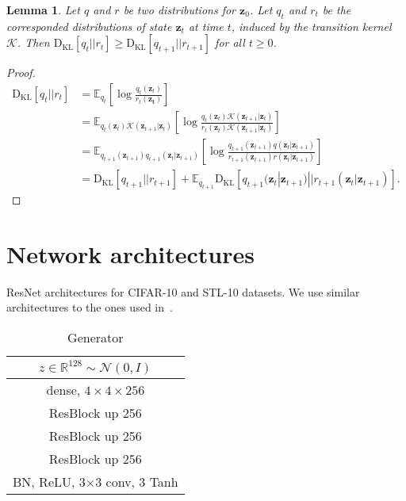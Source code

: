 \documentclass{article}
\newtheorem{lemma}{Lemma}
\begin{document}
\begin{lemma}\label{lem:dd}
\cite{cover2012elements}
Let $q$ and $r$ be two distributions for $\bm{z}_0$. Let $q_t$ and $r_t$ be the corresponded distributions of state $\bm{z}_t$ at time $t$, induced by the transition kernel $\mathcal{K}$. Then $\mathrm{D}_{\text{KL}}[q_t||r_t] \geq \mathrm{D}_{\text{KL}}[q_{t+1}||r_{t+1}]$ for all $t \geq 0$.
\end{lemma}
\begin{proof}
\begin{equation*}
\begin{aligned}
\mathrm{D}_{\text{KL}}[q_t||r_t] &= \mathbb{E}_{q_t}\left[ \log \frac{q_t(\bm{z}_t)}{r_t(\bm{z_t})} \right] \\
&= \mathbb{E}_{q_t(\bm{z}_t) \mathcal{K}(\bm{z}_{t+1}|\bm{z}_t) }\left[ \log \frac{q_t(\bm{z}_t) \mathcal{K}(\bm{z}_{t+1}|\bm{z}_t) }{r_t(\bm{z}_t) \mathcal{K}(\bm{z}_{t+1}|\bm{z}_t)} \right] \\
&= \mathbb{E}_{q_{t+1}(\bm{z}_{t+1}) q_{t+1}(\bm{z}_t|\bm{z}_{t+1})}\left[ \log \frac{q_{t+1}(\bm{z}_{t+1}) q(\bm{z}_{t}|\bm{z}_{t+1}) }{r_{t+1}(\bm{z}_{t+1}) r(\bm{z}_{t}|\bm{z}_{t+1})} \right] \\
&= \mathrm{D}_{\text{KL}}[q_{t+1}||r_{t+1}] + \mathbb{E}_{q_{t+1}} \mathrm{D}_{\text{KL}}[q_{t+1}(\bm{z}_t | \bm{z}_{t+1}) || r_{t+1}(\bm{z}_t | \bm{z}_{t+1})].
\end{aligned}
\end{equation*}
\end{proof}



\section{Network architectures}
\label{app:sec:network-arch}

ResNet architectures for CIFAR-10 and STL-10 datasets. We use similar architectures to the ones used in~\cite{gulrajani2017improved}.

\begin{table}[!h]
\centering
\begin{tabular}{c}
    \toprule
    \midrule
    $z\in \mathbb{R}^{128} \sim \mathcal{N}(0, I)$ \\
    \midrule
    dense, $4 \times 4 \times 256$ \\
    \midrule
    ResBlock up 256\\
    \midrule
    ResBlock up 256\\
    \midrule
    ResBlock up 256\\
    \midrule
    BN, ReLU, 3$\times$3 conv, 3 Tanh\\
    \midrule
    \bottomrule
\end{tabular}
\vspace{+5pt}
\caption{Generator}
\end{table}
\end{document}
